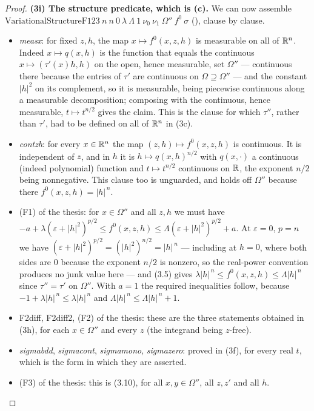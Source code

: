 \begin{proof}
\textbf{(3i) The structure predicate, which is (c).}  We can now assemble
$\mathrm{VariationalStructureF123}\ n\ n\ 0\ \lambda\ \Lambda\ 1\ \nu_0\ \nu_1\
\Omega''\ f^0\ \sigma$ (), clause by clause.
\begin{itemize}
\item \emph{measx}: for fixed $z,h$, the map $x\mapsto f^0(x,z,h)$ is measurable
  on all of $\mathbb{R}^n$.  Indeed $x\mapsto q(x,h)$ is the function that equals the
  continuous $x\mapsto(\tau'(x)h,h)$ on the open, hence measurable, set
  $\Omega''$ --- continuous there because the entries of $\tau'$ are continuous
  on $\Omega\supseteq\Omega''$ --- and the constant $|h|^2$ on its complement,
  so it is measurable, being piecewise continuous along a measurable
  decomposition; composing with the continuous, hence measurable,
  $t\mapsto t^{n/2}$ gives the claim.  This is the clause for which $\tau''$,
  rather than $\tau'$, had to be defined on all of $\mathbb{R}^n$ in (3c).
\item \emph{contzh}: for every $x\in\mathbb{R}^n$ the map
  $(z,h)\mapsto f^0(x,z,h)$ is continuous.  It is independent of $z$, and in $h$
  it is $h\mapsto q(x,h)^{n/2}$ with $q(x,\cdot)$ a continuous (indeed
  polynomial) function and $t\mapsto t^{n/2}$ continuous on $\mathbb{R}$, the exponent
  $n/2$ being nonnegative.  This clause too is unguarded, and holds off
  $\Omega''$ because there $f^0(x,z,h)=|h|^{\,n}$.
\item (F1) of the thesis: for $x\in\Omega''$ and all $z,h$ we must have
  $-a+\lambda(\varepsilon+|h|^2)^{p/2}\le f^0(x,z,h)
  \le\Lambda(\varepsilon+|h|^2)^{p/2}+a$.  At $\varepsilon=0$, $p=n$ we have
  $(\varepsilon+|h|^2)^{p/2}=(|h|^2)^{n/2}=|h|^{\,n}$ --- including at $h=0$,
  where both sides are $0$ because the exponent $n/2$ is nonzero, so the
  real-power convention produces no junk value here --- and (3.5) gives
  $\lambda|h|^{\,n}\le f^0(x,z,h)\le\Lambda|h|^{\,n}$ since $\tau''=\tau'$ on
  $\Omega''$.  With $a=1$ the required inequalities follow, because
  $-1+\lambda|h|^{\,n}\le\lambda|h|^{\,n}$ and
  $\Lambda|h|^{\,n}\le\Lambda|h|^{\,n}+1$.
\item \textup{F2diff}, \textup{F2diff2}, (F2) of the thesis: these are the three
  statements obtained in (3h), for each $x\in\Omega''$ and every $z$ (the
  integrand being $z$-free).
\item \emph{sigmabdd}, \emph{sigmacont}, \emph{sigmamono}, \emph{sigmazero}:
  proved in (3f), for every real $t$, which is the form in which they are
  asserted.
\item (F3) of the thesis: this is (3.10), for all $x,y\in\Omega''$, all $z,z'$ and all
  $h$.
\end{itemize}


\end{proof}
